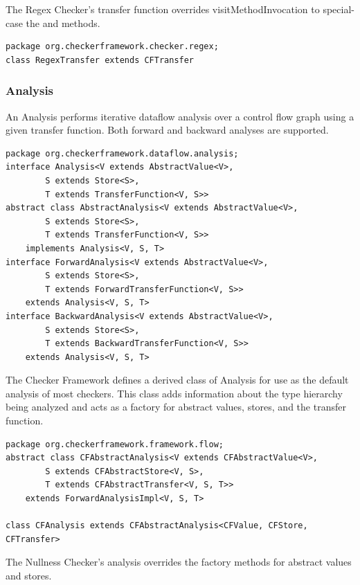 The Regex Checker's transfer function overrides visitMethodInvocation
to special-case the  and  methods.

\begin{verbatim}
package org.checkerframework.checker.regex;
class RegexTransfer extends CFTransfer
\end{verbatim}


\subsubsection{Analysis}
\label{sec:analysis_classes}

An Analysis performs iterative dataflow analysis over a control flow
graph using a given transfer function.  Both forward and backward
analyses are supported.

\begin{verbatim}
package org.checkerframework.dataflow.analysis;
interface Analysis<V extends AbstractValue<V>,
        S extends Store<S>,
        T extends TransferFunction<V, S>>
abstract class AbstractAnalysis<V extends AbstractValue<V>,
        S extends Store<S>,
        T extends TransferFunction<V, S>>
    implements Analysis<V, S, T>
interface ForwardAnalysis<V extends AbstractValue<V>,
        S extends Store<S>,
        T extends ForwardTransferFunction<V, S>>
    extends Analysis<V, S, T>
interface BackwardAnalysis<V extends AbstractValue<V>,
        S extends Store<S>,
        T extends BackwardTransferFunction<V, S>>
    extends Analysis<V, S, T>
\end{verbatim}

The Checker Framework defines a derived class of Analysis for use as
the default analysis of most checkers.  This class adds information
about the type hierarchy being analyzed and acts as a factory for
abstract values, stores, and the transfer function.

\begin{verbatim}
package org.checkerframework.framework.flow;
abstract class CFAbstractAnalysis<V extends CFAbstractValue<V>,
        S extends CFAbstractStore<V, S>,
        T extends CFAbstractTransfer<V, S, T>>
    extends ForwardAnalysisImpl<V, S, T>

class CFAnalysis extends CFAbstractAnalysis<CFValue, CFStore, CFTransfer>
\end{verbatim}

The Nullness Checker's analysis overrides the factory methods for
abstract values and stores.

